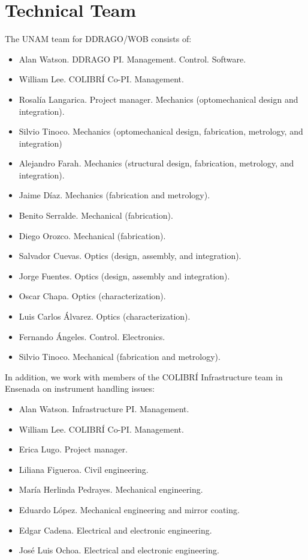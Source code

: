 \documentclass{article}
\begin{document}
\section{Technical Team}

The UNAM team for DDRAGO/WOB consists of:
\begin{itemize}
\item Alan Watson. DDRAGO PI. Management. Control. Software.
\item William Lee. COLIBRÍ Co-PI. Management.
\item Rosalía Langarica. Project manager. Mechanics (optomechanical design and integration).
\item Silvio Tinoco. Mechanics (optomechanical design, fabrication, metrology, and integration)
\item Alejandro Farah. Mechanics (structural design, fabrication, metrology, and integration).
\item Jaime Díaz. Mechanics (fabrication and metrology).
\item Benito Serralde. Mechanical (fabrication).
\item Diego Orozco. Mechanical (fabrication).
\item Salvador Cuevas. Optics (design, assembly, and integration).
\item Jorge Fuentes. Optics (design, assembly and integration).
\item Oscar Chapa. Optics (characterization).
\item Luis Carlos Álvarez. Optics (characterization).
\item Fernando Ángeles. Control. Electronics.
\item Silvio Tinoco. Mechanical (fabrication and metrology).
\end{itemize}

In addition, we work with members of the COLIBRÍ Infrastructure team in Ensenada on instrument handling issues:
\begin{itemize}
\item Alan Watson. Infrastructure PI. Management.
\item William Lee. COLIBRÍ Co-PI. Management.
\item Erica Lugo. Project manager.
\item Liliana Figueroa. Civil engineering.
\item María Herlinda Pedrayes. Mechanical engineering.
\item Eduardo López. Mechanical engineering and mirror coating.
\item Edgar Cadena. Electrical and electronic engineering.
\item José Luis Ochoa. Electrical and electronic engineering.
\end{itemize}
\end{document}
